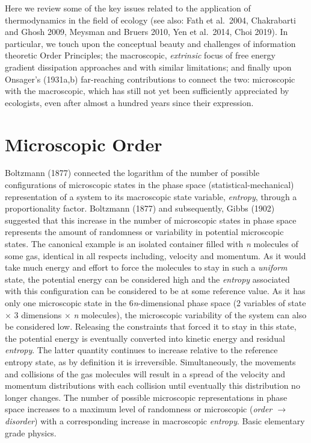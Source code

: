 \documentclass[11pt,letterpaper,]{paper}
\begin{document}
Here we review some of the key issues related to the application of
thermodynamics in the field of ecology (see also: Fath et al.~2004,
Chakrabarti and Ghosh 2009, Meysman and Bruers 2010, Yen et al.~2014,
Choi 2019). In particular, we touch upon the conceptual beauty and
challenges of information theoretic Order Principles; the macroscopic,
\emph{extrinsic} focus of free energy gradient dissipation approaches
and with similar limitations; and finally upon Onsager's (1931a,b)
far-reaching contributions to connect the two: microscopic with the
macroscopic, which has still not yet been sufficiently appreciated by
ecologists, even after almost a hundred years since their expression.

\section{Microscopic Order}\label{microscopic-order}

Boltzmann (1877) connected the logarithm of the number of possible
configurations of microscopic states in the phase space
(statistical-mechanical) representation of a system to its macroscopic
state variable, \emph{entropy}, through a proportionality factor.
Boltzmann (1877) and subsequently, Gibbs (1902) suggested that this
increase in the number of microscopic states in phase space represents
the amount of randomness or variability in potential microscopic states.
The canonical example is an isolated container filled with \emph{n}
molecules of some gas, identical in all respects including, velocity and
momentum. As it would take much energy and effort to force the molecules
to stay in such a \emph{uniform} state, the potential energy can be
considered high and the \emph{entropy} associated with this
configuration can be considered to be at some reference value. As it has
only one microscopic state in the 6\emph{n}-dimensional phase space (2
variables of state \(\times\) 3 dimensions \(\times\) \emph{n}
molecules), the microscopic variability of the system can also be
considered low. Releasing the constraints that forced it to stay in this
state, the potential energy is eventually converted into kinetic energy
and residual \emph{entropy}. The latter quantity continues to increase
relative to the reference entropy state, as by definition it is
irreversible. Simultaneously, the movements and collisions of the gas
molecules will result in a spread of the velocity and momentum
distributions with each collision until eventually this distribution no
longer changes. The number of possible microscopic representations in
phase space increases to a maximum level of randomness or microscopic
(\emph{order \(\rightarrow\) disorder}) with a corresponding increase in
macroscopic \emph{entropy}. Basic elementary grade physics.
\end{document}

